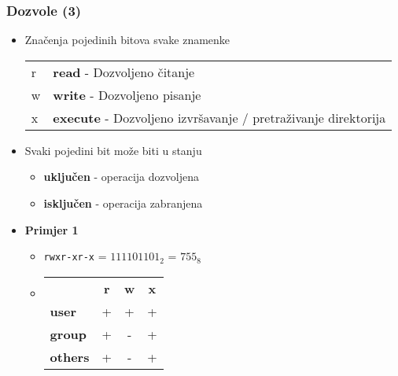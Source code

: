 \documentclass[table,usenames,dvipsnames] {beamer}
\newcommand{\shell}[1]{\texttt{#1}}
\begin{document}
\begin{frame}[t]
\frametitle{Dozvole (3)}
\begin{itemize}
  \item Značenja pojedinih bitova svake znamenke
    \begin{tabular}{l l}
     r & \textbf{read} - Dozvoljeno čitanje \\
     w & \textbf{write} - Dozvoljeno pisanje \\
     x & \textbf{execute} - Dozvoljeno izvršavanje / pretraživanje direktorija
    \end{tabular}
      \item Svaki pojedini bit može biti u stanju
      \begin{itemize}
        \item \textbf{uključen} - operacija dozvoljena
        \item \textbf{isključen} - operacija zabranjena
      \end{itemize}
\end{itemize}
\vfill
\begin{itemize}
  \item \textbf{Primjer 1}
  \begin{itemize}
    \item[] \shell{rwxr-xr-x} = $111101101_2$ = $755_8$
    \item[] \hspace{1em} \begin{tabular}{l c c c}
      & \textbf{r} & \textbf{w} & \textbf{x}\\
      \textbf{user} & + & + & +\\
      \textbf{group} & + & - & +\\
      \textbf{others} & + & - & +
    \end{tabular}
  \end{itemize}
\end{itemize}
\end{frame}
\end{document}
